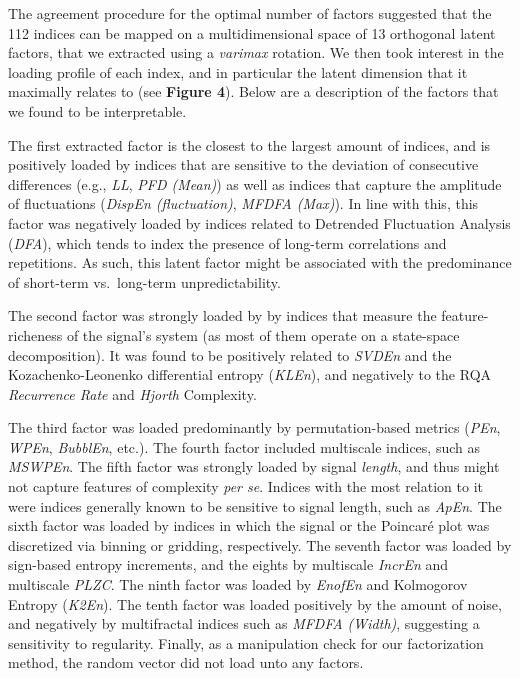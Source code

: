 \documentclass[
  man]{apa6}
\begin{document}
The agreement procedure for the optimal number of factors suggested that the 112 indices can be mapped on a multidimensional space of 13 orthogonal latent factors, that we extracted using a \emph{varimax} rotation. We then took interest in the loading profile of each index, and in particular the latent dimension that it maximally relates to (see \textbf{Figure 4}). Below are a description of the factors that we found to be interpretable.

The first extracted factor is the closest to the largest amount of indices, and is positively loaded by indices that are sensitive to the deviation of consecutive differences (e.g., \emph{LL}, \emph{PFD (Mean)}) as well as indices that capture the amplitude of fluctuations (\emph{DispEn (fluctuation)}, \emph{MFDFA (Max)}). In line with this, this factor was negatively loaded by indices related to Detrended Fluctuation Analysis (\emph{DFA}), which tends to index the presence of long-term correlations and repetitions. As such, this latent factor might be associated with the predominance of short-term vs.~long-term unpredictability.

The second factor was strongly loaded by by indices that measure the feature-richeness of the signal's system (as most of them operate on a state-space decomposition). It was found to be positively related to \emph{SVDEn} and the Kozachenko-Leonenko differential entropy (\emph{KLEn}), and negatively to the RQA \emph{Recurrence Rate} and \emph{Hjorth} Complexity.

The third factor was loaded predominantly by permutation-based metrics (\emph{PEn}, \emph{WPEn}, \emph{BubblEn}, etc.). The fourth factor included multiscale indices, such as \emph{MSWPEn}. The fifth factor was strongly loaded by signal \emph{length}, and thus might not capture features of complexity \emph{per se}. Indices with the most relation to it were indices generally known to be sensitive to signal length, such as \emph{ApEn}. The sixth factor was loaded by indices in which the signal or the Poincaré plot was discretized via binning or gridding, respectively. The seventh factor was loaded by sign-based entropy increments, and the eights by multiscale \emph{IncrEn} and multiscale \emph{PLZC}. The ninth factor was loaded by \emph{EnofEn} and Kolmogorov Entropy (\emph{K2En}). The tenth factor was loaded positively by the amount of noise, and negatively by multifractal indices such as \emph{MFDFA (Width)}, suggesting a sensitivity to regularity. Finally, as a manipulation check for our factorization method, the random vector did not load unto any factors.
\end{document}
